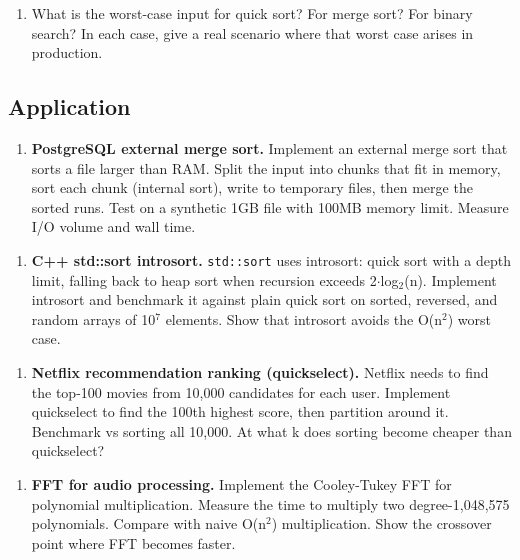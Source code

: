 \begin{enumerate}
\item What is the worst-case input for quick sort? For merge sort? For binary search? In each case, give a real scenario where that worst case arises in production.
\end{enumerate}

\subsection{Application}

\begin{enumerate}
\item \textbf{PostgreSQL external merge sort.} Implement an external merge sort that sorts a file larger than RAM. Split the input into chunks that fit in memory, sort each chunk (internal sort), write to temporary files, then merge the sorted runs. Test on a synthetic 1GB file with 100MB memory limit. Measure I/O volume and wall time.
\end{enumerate}

\begin{enumerate}
\item \textbf{C++ std::sort introsort.} \texttt{std::sort} uses introsort: quick sort with a depth limit, falling back to heap sort when recursion exceeds 2$\cdot $log$_{2}$(n). Implement introsort and benchmark it against plain quick sort on sorted, reversed, and random arrays of 10$^{7}$ elements. Show that introsort avoids the O(n$^{2}$) worst case.
\end{enumerate}

\begin{enumerate}
\item \textbf{Netflix recommendation ranking (quickselect).} Netflix needs to find the top-100 movies from 10,000 candidates for each user. Implement quickselect to find the 100th highest score, then partition around it. Benchmark vs sorting all 10,000. At what k does sorting become cheaper than quickselect?
\end{enumerate}

\begin{enumerate}
\item \textbf{FFT for audio processing.} Implement the Cooley-Tukey FFT for polynomial multiplication. Measure the time to multiply two degree-1,048,575 polynomials. Compare with naive O(n$^{2}$) multiplication. Show the crossover point where FFT becomes faster.
\end{enumerate}

